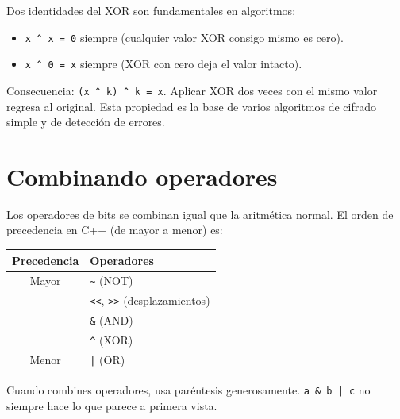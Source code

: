 \documentclass[12pt, oneside]{article}
\begin{document}
\begin{tecnico}
  Dos identidades del XOR son fundamentales en algoritmos:
  \begin{itemize}
    \item \texttt{x \textasciicircum{} x = 0} siempre
          (cualquier valor XOR consigo mismo es cero).
    \item \texttt{x \textasciicircum{} 0 = x} siempre
          (XOR con cero deja el valor intacto).
  \end{itemize}
  Consecuencia: \texttt{(x \textasciicircum{} k) \textasciicircum{} k = x}.
  Aplicar XOR dos veces con el mismo valor regresa al original.
  Esta propiedad es la base de varios algoritmos de cifrado simple y de
  detección de errores.
\end{tecnico}

\section{Combinando operadores}

Los operadores de bits se combinan igual que la aritmética normal.
El orden de precedencia en C++ (de mayor a menor) es:

\begin{center}
\begin{tabular}{cl}
  \toprule
  \textbf{Precedencia} & \textbf{Operadores} \\
  \midrule
  Mayor & \texttt{\textasciitilde} (NOT) \\
        & \texttt{<<}, \texttt{>>} (desplazamientos) \\
        & \texttt{\&} (AND) \\
        & \texttt{\textasciicircum} (XOR) \\
  Menor & \texttt{|} (OR) \\
  \bottomrule
\end{tabular}
\end{center}

\begin{consejo}
  Cuando combines operadores, usa paréntesis generosamente.
  \texttt{a \& b | c} no siempre hace lo que parece a primera vista.
\end{consejo}
\end{document}
